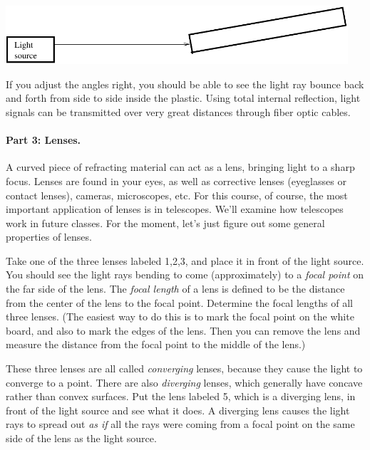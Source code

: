 \centerline{\includegraphics[width=5in]{lenses1/lensfig4.pdf}}



If you adjust the angles right, you should be able to see the light ray
bounce back and forth from side to side inside the plastic.  
Using total internal reflection, 
light signals can be transmitted over very great distances through
fiber optic cables.

\paragraph{Part 3: Lenses.}
A curved piece of refracting material can act as a lens, bringing
light to a sharp focus.  Lenses are found in your eyes, as well as
corrective lenses (eyeglasses or contact lenses), cameras,
microscopes, etc.  For this course, of course, the most important
application of lenses is in telescopes.  We'll examine how telescopes
work in future classes.  For the moment, let's just figure
out some general properties of lenses.

Take one of the three lenses labeled 1,2,3, and place it in front
of the light source.  You should see the light rays bending to
come (approximately) to a {\it focal point} on the far side of the lens.  
The {\it focal length} of a lens is defined to be the distance from the center
of the lens to the focal point.  Determine the focal lengths of all
three lenses.  (The easiest way to do this is to mark the focal point
on the white board, and also to mark the edges of the lens.  Then
you can remove the lens and measure the distance from the focal
point to the middle of the lens.)

\answerspace{2.5in}

These three lenses are all called {\it converging} lenses, because
they cause the light to converge to a point.  There are also {\it diverging}
lenses, which generally have concave rather than convex surfaces.  Put
the lens labeled 5, which is a diverging lens, 
in front of the light source and see what it does.
A diverging lens causes the light rays to spread out {\it as if} all the
rays were coming from a focal point on the same side of the lens
as the light source.

